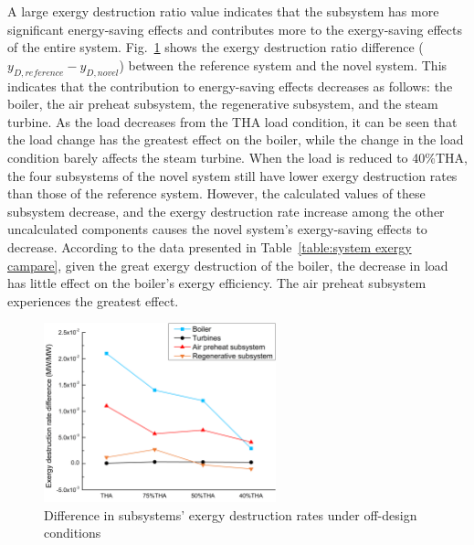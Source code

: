 \documentclass[preprint,12pt]{elsarticle}
\begin{document}
A large exergy destruction ratio value indicates that the subsystem has more significant energy-saving effects and contributes more to the exergy-saving effects of the entire system.
Fig.~\ref{fig:partload_subsys_exergyrate} shows the exergy destruction ratio difference ($y_{D,reference}-y_{D,novel}$) between the reference system and the novel system.
This indicates that the contribution to energy-saving effects decreases as follows: the boiler, the air preheat subsystem, the regenerative subsystem, and the steam turbine.
As the load decreases from the THA load condition, it can be seen that the load change has the greatest effect on the boiler, while the change in the load condition barely affects the steam turbine.
When the load is reduced to 40\%THA, the four subsystems of the novel system still have lower exergy destruction rates than those of the reference system.
However, the calculated values of these subsystem decrease, 
and the exergy destruction rate increase among the other uncalculated components causes the novel system's exergy-saving effects to decrease.
According to the data presented in Table~\ref{table:system exergy campare}, given the great exergy destruction of the boiler, the decrease in load has little effect on the boiler's exergy efficiency. The air preheat subsystem experiences the greatest effect.


\begin{figure}[htbp]
\centering
\includegraphics[width=0.6\textwidth]{fig/partload_subsys_exergyrate.png}
\caption{Difference in subsystems' exergy destruction rates under off-design conditions} 
\label{fig:partload_subsys_exergyrate}
\end{figure}
\end{document}
